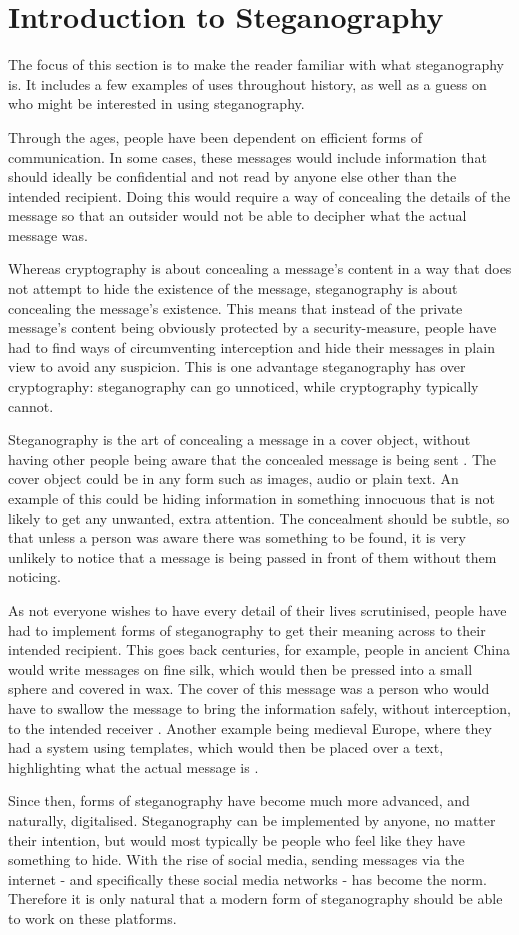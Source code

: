 \section{Introduction to Steganography}
The focus of this section is to make the reader familiar with what steganography is. It includes a few examples of uses throughout history, as well as a guess on who might be interested in using steganography.\vspace*{12pt}

\noindent Through the ages, people have been dependent on efficient forms of communication. 
In some cases, these messages would include information that should ideally be confidential and not read by anyone else other than the intended recipient.
Doing this would require a way of concealing the details of the message so that an outsider would not be able to decipher what the actual message was.

Whereas cryptography is about concealing a message's content in a way that does not attempt to hide the existence of the message, steganography is about concealing the message's existence.
This means that instead of the private message's content being obviously protected by a security-measure, people have had to find ways of circumventing interception and hide their messages in plain view to avoid any suspicion.
This is one advantage steganography has over cryptography: steganography can go unnoticed, while cryptography typically cannot. 

Steganography is the art of concealing a message in a cover object, without having other people being aware that the concealed message is being sent \citep{Anderson1998}.
The cover object could be in any form such as images, audio or plain text.
An example of this could be hiding information in something innocuous that is not likely to get any unwanted, extra attention.
The concealment should be subtle, so that unless a person was aware there was something to be found, it is very unlikely to notice that a message is being passed in front of them without them noticing.

As not everyone wishes to have every detail of their lives scrutinised, people have had to implement forms of steganography to get their meaning across to their intended recipient.
This goes back centuries, for example, people in ancient China would write messages on fine silk, which would then be pressed into a small sphere and covered in wax.
The cover of this message was a person who would have to swallow the message to bring the information safely, without interception, to the intended receiver \citep{Singh2001}.
Another example being medieval Europe, where they had a system using templates, which would then be placed over a text, highlighting what the actual message is \citep{Anderson1998}.

Since then, forms of steganography have become much more advanced, and naturally, digitalised.
Steganography can be implemented by anyone, no matter their intention, but would most typically be people who feel like they have something to hide.
With the rise of social media, sending messages via the internet - and specifically these social media networks - has become the norm.
Therefore it is only natural that a modern form of steganography should be able to work on these platforms. 
